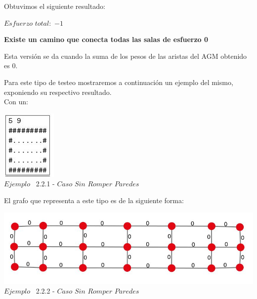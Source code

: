   Obtuvimos el siguiente resultado:

$Esfuerzo$ $total: $ $-1$\\




 \begin{center}
 \textbf{Existe un camino que conecta todas las salas de esfuerzo 0}
\end{center}

Esta versi\'on se da cuando la suma de los pesos de las aristas del AGM obtenido es 0. 

Para este tipo de testeo mostraremos a continuaci\'on un ejemplo del mismo, exponiendo su respectivo resultado.\\

 
 Con un:
 
\vspace*{0.3cm} \vspace*{0.3cm}
  \begin{center}
 \includegraphics[scale=0.65]{./EJ2/ej2sinpared.jpeg}
 \\{$Ejemplo$ \ 2.2.1 - $Caso$ $Sin$ $Romper$ $Paredes$}
  \end{center}
  \vspace*{0.3cm}

El grafo que representa a este tipo es de la siguiente forma:\\

\vspace*{0.3cm} \vspace*{0.3cm}
  \begin{center}
 \includegraphics[scale=0.5]{./EJ2/ej2grafosinpared.jpeg}
 \\{$Ejemplo$ \ 2.2.2 - $Caso$ $Sin$ $Romper$ $Paredes$}
  \end{center}
  \vspace*{0.3cm}

